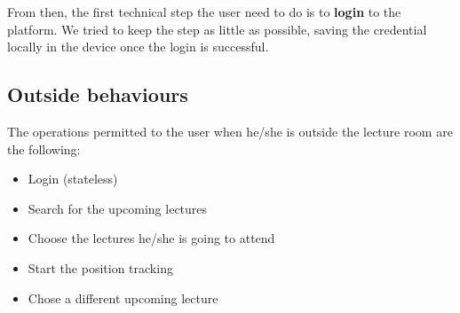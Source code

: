 From then, the first technical step the user need to do is to \textbf{login} to the platform. We tried to keep the step as little as possible, saving the credential locally in the device once the login is successful.

\subsection{Outside behaviours}

The operations permitted to the user when he/she is outside the lecture room are the following:
\begin{itemize}
\item Login (stateless)
\item Search for the upcoming lectures
\item Choose the lectures he/she is going to attend
\item Start the position tracking
\item Chose a different upcoming lecture
\end{itemize}

